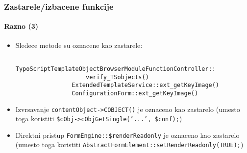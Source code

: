 \begin{frame}[fragile]
	\frametitle{Zastarele/izbacene funkcije}
	\framesubtitle{Razno (3)}

	\begin{itemize}
		\item Sledece metode su oznacene kao zastarele:

			\begin{lstlisting}
				TypoScriptTemplateObjectBrowserModuleFunctionController::
				    verify_TSobjects()
				ExtendedTemplateService::ext_getKeyImage()
				ConfigurationForm::ext_getKeyImage()
			\end{lstlisting}

 		\item Izvrsavanje \texttt{contentObject->COBJECT()} je oznaceno kao zastarelo\newline
 			\small(umesto toga koristiti \texttt{\$cObj->cObjGetSingle('...', \$conf);})\normalsize
 
		\item Direktni pristup \texttt{FormEngine::\$renderReadonly} je oznaceno kao zastarelo\newline
			\small(umesto toga koristiti \texttt{AbstractFormElement::setRenderReadonly(TRUE);})\normalsize
 
	\end{itemize}

\end{frame}


